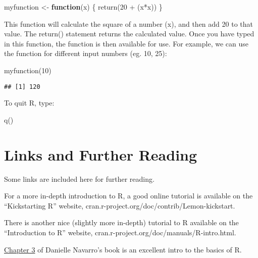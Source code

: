 \documentclass[
]{book}
\newenvironment{Shaded}{\begin{snugshade}}{\end{snugshade}}
\newcommand{\ControlFlowTok}[1]{\textcolor[rgb]{0.13,0.29,0.53}{\textbf{#1}}}
\newcommand{\DecValTok}[1]{\textcolor[rgb]{0.00,0.00,0.81}{#1}}
\newcommand{\FunctionTok}[1]{\textcolor[rgb]{0.00,0.00,0.00}{#1}}
\newcommand{\NormalTok}[1]{#1}
\newcommand{\OtherTok}[1]{\textcolor[rgb]{0.56,0.35,0.01}{#1}}
\newcommand{\SpecialCharTok}[1]{\textcolor[rgb]{0.00,0.00,0.00}{#1}}
\begin{document}
\begin{Shaded}
\begin{Highlighting}[]
\NormalTok{myfunction }\OtherTok{\textless{}{-}} \ControlFlowTok{function}\NormalTok{(x) \{ }\FunctionTok{return}\NormalTok{(}\DecValTok{20} \SpecialCharTok{+}\NormalTok{ (x}\SpecialCharTok{*}\NormalTok{x)) \}}
\end{Highlighting}
\end{Shaded}

This function will calculate the square of a number (x), and then add 20 to that value. The return() statement returns the calculated value. Once you have typed in this function, the function is then available for use. For example, we can use the function for different input numbers (eg. 10, 25):

\begin{Shaded}
\begin{Highlighting}[]
\FunctionTok{myfunction}\NormalTok{(}\DecValTok{10}\NormalTok{)}
\end{Highlighting}
\end{Shaded}

\begin{verbatim}
## [1] 120
\end{verbatim}

To quit R, type:

\begin{Shaded}
\begin{Highlighting}[]
\FunctionTok{q}\NormalTok{()}
\end{Highlighting}
\end{Shaded}

\hypertarget{links-and-further-reading}{%
\section{Links and Further Reading}\label{links-and-further-reading}}

Some links are included here for further reading.

For a more in-depth introduction to R, a good online tutorial is available on the ``Kickstarting R'' website, cran.r-project.org/doc/contrib/Lemon-kickstart.

There is another nice (slightly more in-depth) tutorial to R available on the ``Introduction to R'' website, cran.r-project.org/doc/manuals/R-intro.html.

\href{https://learningstatisticswithr.com/book/introR.html}{Chapter 3} of Danielle Navarro's book is an excellent intro to the basics of R.
\end{document}
